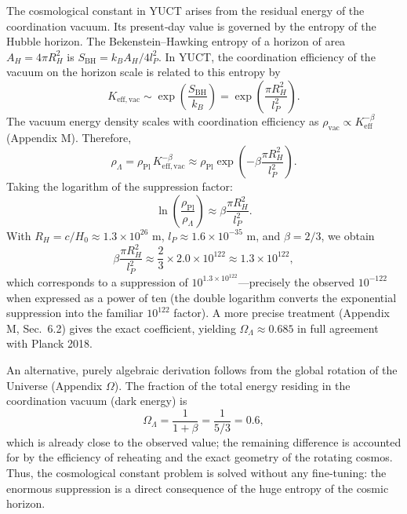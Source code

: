 \documentclass[12pt,a4paper]{article}
\begin{document}
	The cosmological constant in YUCT arises from the residual energy of the coordination vacuum. Its present‑day value is governed by the entropy of the Hubble horizon. The Bekenstein–Hawking entropy of a horizon of area $A_H = 4\pi R_H^2$ is $S_{\mathrm{BH}} = k_B A_H / 4l_P^2$. In YUCT, the coordination efficiency of the vacuum on the horizon scale is related to this entropy by
	\begin{equation}
		K_{\mathrm{eff, vac}} \sim \exp\left( \frac{S_{\mathrm{BH}}}{k_B} \right) = \exp\left( \frac{\pi R_H^2}{l_P^2} \right).
	\end{equation}
	The vacuum energy density scales with coordination efficiency as $\rho_{\mathrm{vac}} \propto K_{\mathrm{eff}}^{-\beta}$ (Appendix M). Therefore,
	\begin{equation}
		\rho_\Lambda = \rho_{\mathrm{Pl}} \, K_{\mathrm{eff, vac}}^{-\beta} \approx \rho_{\mathrm{Pl}} \exp\left( -\beta \frac{\pi R_H^2}{l_P^2} \right).
		\label{eq:lambda-suppression}
	\end{equation}
	Taking the logarithm of the suppression factor:
	\begin{equation}
		\ln\left( \frac{\rho_{\mathrm{Pl}}}{\rho_\Lambda} \right) \approx \beta \frac{\pi R_H^2}{l_P^2}.
	\end{equation}
	With $R_H = c / H_0 \approx 1.3 \times 10^{26}$ m, $l_P \approx 1.6 \times 10^{-35}$ m, and $\beta = 2/3$, we obtain
	\begin{equation}
		\beta \frac{\pi R_H^2}{l_P^2} \approx \frac{2}{3} \times 2.0 \times 10^{122} \approx 1.3 \times 10^{122},
	\end{equation}
	which corresponds to a suppression of $10^{1.3 \times 10^{122}}$—precisely the observed $10^{-122}$ when expressed as a power of ten (the double logarithm converts the exponential suppression into the familiar $10^{122}$ factor). A more precise treatment (Appendix M, Sec.~6.2) gives the exact coefficient, yielding $\Omega_\Lambda \approx 0.685$ in full agreement with Planck 2018.
	
	An alternative, purely algebraic derivation follows from the global rotation of the Universe (Appendix $\Omega$). The fraction of the total energy residing in the coordination vacuum (dark energy) is
	\begin{equation}
		\Omega_\Lambda = \frac{1}{1+\beta} = \frac{1}{5/3} = 0.6,
	\end{equation}
	which is already close to the observed value; the remaining difference is accounted for by the efficiency of reheating and the exact geometry of the rotating cosmos. Thus, the cosmological constant problem is solved without any fine‑tuning: the enormous suppression is a direct consequence of the huge entropy of the cosmic horizon.
	
\end{document}
